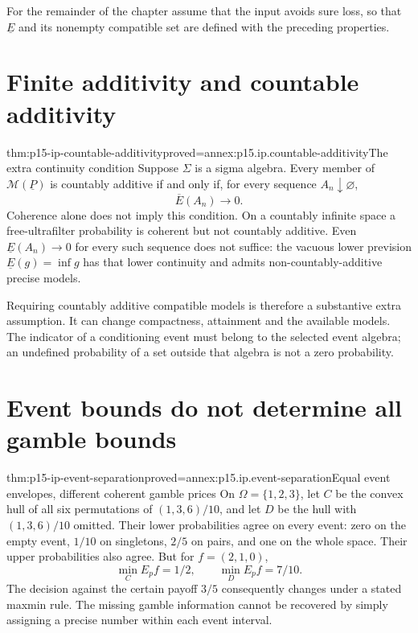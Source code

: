 For the remainder of the chapter assume that the input avoids sure loss,
so that \(\underline E\) and its nonempty compatible set are defined
with the preceding properties.

\section{Finite additivity and countable additivity}
\label{sec:p15-ip-additivity}

\begin{hbtheorem}{thm:p15-ip-countable-additivity}{proved=annex:p15.ip.countable-additivity}{The extra continuity condition}
Suppose \(\Sigma\) is a sigma algebra. Every member of
\(\mathcal M(\underline P)\) is countably additive if and only if,
for every sequence \(A_n\downarrow\varnothing\),
\[
                         \overline E(A_n)\longrightarrow0.
\]
Coherence alone does not imply this condition. On a countably infinite
space a free-ultrafilter probability is coherent but not countably
additive. Even \(\underline E(A_n)\to0\) for every such sequence does
not suffice: the vacuous lower prevision \(\underline E(g)=\inf g\)
has that lower continuity and admits non-countably-additive precise models.
\end{hbtheorem}

Requiring countably additive compatible models is therefore a substantive
extra assumption. It can change compactness, attainment and the available
models. The indicator of a conditioning event must belong to the selected
event algebra; an undefined probability of a set outside that algebra is
not a zero probability.

\section{Event bounds do not determine all gamble bounds}
\label{sec:p15-ip-event-information}

\begin{hbtheorem}{thm:p15-ip-event-separation}{proved=annex:p15.ip.event-separation}{Equal event envelopes, different coherent gamble prices}
On \(\Omega=\{1,2,3\}\), let \(C\) be the convex hull of all six
permutations of \((1,3,6)/10\), and let \(D\) be the hull with
\((1,3,6)/10\) omitted. Their lower probabilities agree on every event:
zero on the empty event, \(1/10\) on singletons, \(2/5\) on pairs,
and one on the whole space. Their upper probabilities also agree.
But for \(f=(2,1,0)\),
\[
                \min_C E_p f=1/2,\qquad \min_D E_p f=7/10.
\]
The decision against the certain payoff \(3/5\) consequently changes
under a stated maxmin rule. The missing gamble information cannot be
recovered by simply assigning a precise number within each event interval.
\end{hbtheorem}

